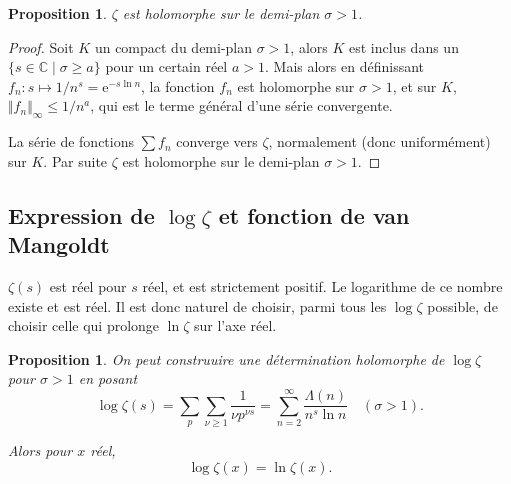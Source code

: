 \documentclass[french]{report}
\newtheorem{proposition}[theorem]{Proposition}
\begin{document}
\begin{proposition}
  $\zeta$ est holomorphe sur le demi-plan $\sigma > 1$.
\end{proposition}

\begin{proof}
  Soit $K$ un compact du demi-plan $\sigma > 1$, alors $K$ est inclus dans un $\{ s\in\mathbb{C} \mid \sigma \geq a \}$ pour un certain réel $a > 1$. Mais alors en définissant $f_n: s \mapsto 1 / n^s = \mathrm{e}^{-s\ln n}$, la fonction $f_n$ est holomorphe sur $\sigma > 1$, et sur $K$, $\Vert{f_n}\Vert_\infty \leq 1 / n^a$, qui est le terme général d'une série convergente.
  
  La série de fonctions $\sum f_n$ converge vers $\zeta$, normalement (donc uniformément) sur $K$. Par suite $\zeta$ est holomorphe sur le demi-plan $\sigma > 1$.
\end{proof}

\subsection{Expression de $\log\zeta$ et fonction de van Mangoldt}

$\zeta(s)$ est réel pour $s$ réel, et est strictement positif. Le logarithme de ce nombre existe et est réel. Il est donc naturel de choisir, parmi tous les $\log\zeta$ possible, de choisir celle qui prolonge $\ln\zeta$ sur l'axe réel.

\begin{proposition}\label{prop:log-zeta}
  On peut construuire une détermination holomorphe de $\log\zeta$ pour $\sigma>1$ en posant
  \[
    \log\zeta(s)
    = \sum_p\sum_{\nu\geq1}\frac{1}{\nu p^{\nu s}}
    = \sum_{n=2}^\infty\frac{\Lambda(n)}{n^s\ln n}\quad(\sigma>1).
  \]

  Alors pour $x$ réel,
  \[ \log\zeta(x) = \ln\zeta(x). \]
\end{proposition}
\end{document}
